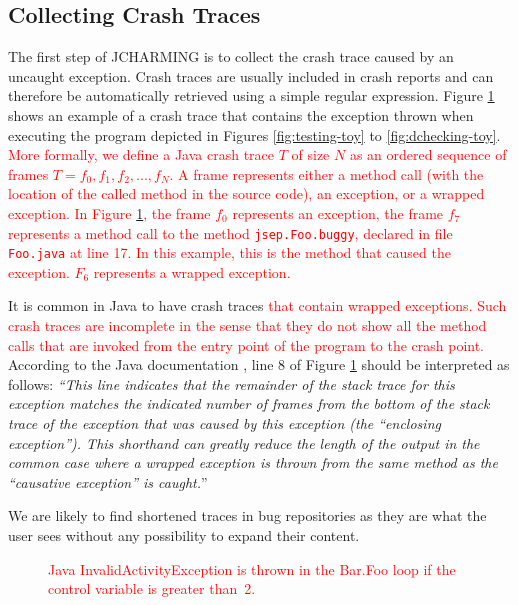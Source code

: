 \documentclass[times, doublespace]{smrauth}
\newcommand{\red}[1]{\textcolor{red}{#1}}
\begin{document}
\subsection{Collecting Crash Traces}

The first step of JCHARMING is to collect the crash trace
caused by an uncaught exception. Crash traces are usually included in crash reports and can therefore be automatically
retrieved using a simple regular expression.
Figure \ref{fig:jcarming-traces} shows an example of a crash trace that contains the
exception thrown when executing the program depicted in
Figures \ref{fig:testing-toy} to \ref{fig:dchecking-toy}.
\red{More formally, we define a Java crash trace $T$ of size $N$ as an ordered sequence of frames $T={f_0, f_1, f_2, ..., f_N}$. A frame represents either a method call (with the location of the called method in the source code), an exception, or a wrapped exception.
In Figure \ref{fig:jcarming-traces}, the frame $f_0$ represents an exception, the frame  $f_7$ represents a method call to the method \texttt{jsep.Foo.buggy}, declared in file \texttt{Foo.java} at  line 17. In this example, this is the method that caused the exception. $F_6$ represents a wrapped exception.}

It is common in Java to have crash
traces \red{that contain wrapped exceptions.
Such crash traces are incomplete in the sense that they do not show all the method calls that are invoked from the entry point of the program to the crash point.}
According to the Java documentation \cite{Oracle2011}, line 8 of
Figure \ref{fig:jcarming-traces} should be interpreted as follows: {\it ``This line indicates
that the remainder of the stack trace for this exception
matches the indicated number of frames from the bottom of the
stack trace of the exception that was caused by this exception
(the ``enclosing exception''). This shorthand can greatly
reduce the length of the output in the common case where a
wrapped exception is thrown from the same method as the
``causative exception'' is caught.}''

We are likely to find shortened traces in bug repositories as
they are what the user sees without any possibility to expand
their content.


\begin{figure}
  \noindent{}
    \caption{\red{Java InvalidActivityException is thrown in the Bar.Foo loop if the control variable is greater than~2.}
    \label{fig:jcarming-traces}}
\end{figure}
\end{document}
